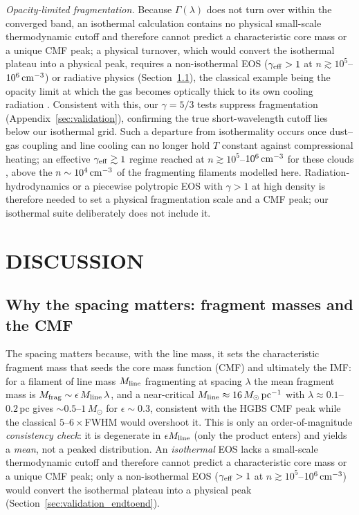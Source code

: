 \documentclass[usenatbib,twoside,twocolumn]{mnras}
\begin{document}
\emph{Opacity-limited fragmentation.} Because $\Gamma(\lambda)$ does not turn over within the converged band, an isothermal calculation contains no physical small-scale thermodynamic cutoff and therefore cannot predict a characteristic core mass or a unique CMF peak; a physical turnover, which would convert the isothermal plateau into a physical peak, requires a non-isothermal EOS ($\gamma_{\rm eff}>1$ at $n\gtrsim10^{5}$--$10^{6}\,{\rm cm^{-3}}$) or radiative physics (Section~\ref{sec:cmf}), the classical example being the opacity limit at which the gas becomes optically thick to its own cooling radiation \citep{Rees1976,LowLyndenBell1976}. Consistent with this, our $\gamma=5/3$ tests suppress fragmentation (Appendix~\ref{sec:validation}), confirming the true short-wavelength cutoff lies below our isothermal grid. Such a departure from isothermality occurs once dust--gas coupling and line cooling can no longer hold $T$ constant against compressional heating; an effective $\gamma_{\rm eff}\gtrsim1$ regime reached at $n\gtrsim10^{5}$--$10^{6}\,{\rm cm^{-3}}$ for these clouds \citep{Larson1985,Glover2012}, above the $n\sim10^{4}\,{\rm cm^{-3}}$ of the fragmenting filaments modelled here. Radiation-hydrodynamics or a piecewise polytropic EOS with $\gamma>1$ at high density is therefore needed to set a physical fragmentation scale and a CMF peak; our isothermal suite deliberately does not include it.

\section{DISCUSSION}
\label{sec:discussion}

\subsection{Why the spacing matters: fragment masses and the CMF}
\label{sec:cmf}
The spacing matters because, with the line mass, it sets the characteristic fragment mass that seeds the core mass function (CMF) and ultimately the IMF: for a filament of line mass $M_{\rm line}$ fragmenting at spacing $\lambda$ the mean fragment mass is $M_{\rm frag}\sim\epsilon\,M_{\rm line}\,\lambda$, and a near-critical $M_{\rm line}\approx16\,M_\odot\,{\rm pc^{-1}}$ with $\lambda\approx0.1$--$0.2$\,pc gives $\sim0.5$--$1\,M_\odot$ for $\epsilon\sim0.3$, consistent with the HGBS CMF peak while the classical $5$--$6\times$FWHM would overshoot it. This is only an order-of-magnitude \emph{consistency check}: it is degenerate in $\epsilon M_{\rm line}$ (only the product enters) and yields a \emph{mean}, not a peaked distribution. An \emph{isothermal} EOS lacks a small-scale thermodynamic cutoff and therefore cannot predict a characteristic core mass or a unique CMF peak; only a non-isothermal EOS ($\gamma_{\rm eff}>1$ at $n\gtrsim10^{5}$--$10^{6}\,{\rm cm^{-3}}$) would convert the isothermal plateau into a physical peak (Section~\ref{sec:validation_endtoend}).
\end{document}
